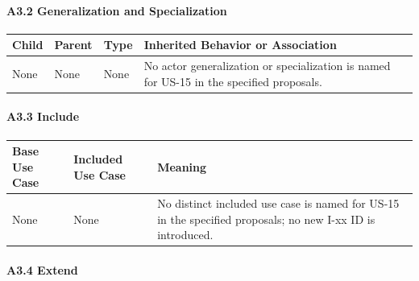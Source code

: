 \documentclass[12pt]{article}
\renewcommand{\baselinestretch}{1.5}
\begin{document}
\hypertarget{sec:a3-2-generalization-and-specialization}{}
\paragraph*{A3.2 Generalization and Specialization}
\par\medskip

\begingroup
\small
\renewcommand{\baselinestretch}{1.0}\selectfont
\renewcommand{\arraystretch}{1.15}
\setlength{\tabcolsep}{6pt}
\begin{longtable}{|>{\raggedright\arraybackslash}p{}|>{\raggedright\arraybackslash}p{}|>{\raggedright\arraybackslash}p{}|>{\raggedright\arraybackslash}p{}|}
\hline
\textbf{Child} & \textbf{Parent} & \textbf{Type} & \textbf{Inherited Behavior or Association} \\ \hline
\endhead
None & None & None & No actor generalization or specialization is named for US-15 in the specified proposals. \\ \hline
\end{longtable}
\endgroup
\par\medskip

\hypertarget{sec:a3-3-include}{}
\paragraph*{A3.3 Include}
\par\medskip

\begingroup
\small
\renewcommand{\baselinestretch}{1.0}\selectfont
\renewcommand{\arraystretch}{1.15}
\setlength{\tabcolsep}{6pt}
\begin{longtable}{|>{\raggedright\arraybackslash}p{}|>{\raggedright\arraybackslash}p{}|>{\raggedright\arraybackslash}p{}|}
\hline
\textbf{Base Use Case} & \textbf{Included Use Case} & \textbf{Meaning} \\ \hline
\endhead
None & None & No distinct included use case is named for US-15 in the specified proposals; no new I-xx ID is introduced. \\ \hline
\end{longtable}
\endgroup
\par\medskip

\hypertarget{sec:a3-4-extend}{}
\paragraph*{A3.4 Extend}
\par\medskip
\end{document}
